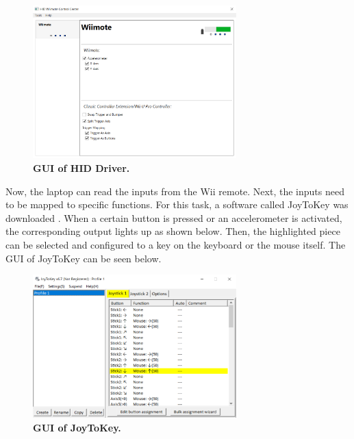 \documentclass[conf]{new-aiaa}
\begin{document}
        \begin{figure}[H]
            \centering
            \includegraphics[width=0.7\textwidth]{docs/reports/Final Project Update/images/HID_GUI.PNG}
            \caption{\textbf{GUI of HID Driver.}}
            \label{fig:HID_driver}
        \end{figure}
        
        Now, the laptop can read the inputs from the Wii remote. Next, the inputs need to be mapped to specific functions. For this task, a software called JoyToKey was downloaded \cite{JoyToKey}. When a certain button is pressed or an accelerometer is activated, the corresponding output lights up as shown below. Then, the highlighted piece can be selected and configured to a key on the keyboard or the mouse itself. The GUI of JoyToKey can be seen below.
        
        \begin{figure}[H]
            \centering
            \includegraphics[width=0.7\textwidth]{docs/reports/Final Project Update/images/JoyToKey_GUI.PNG}
            \caption{\textbf{GUI of JoyToKey.}}
            \label{fig:JoyToKey}
        \end{figure}
        
\end{document}
